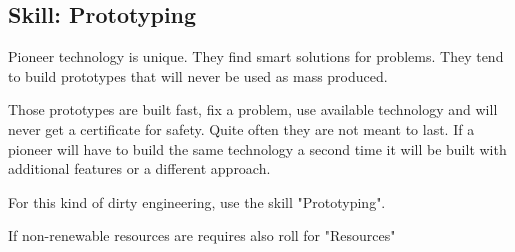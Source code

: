 \subsection{Skill: Prototyping}

Pioneer technology is unique. They find smart solutions for problems. They tend to build prototypes that will never be used as mass produced.

Those prototypes are built fast, fix a problem, use available technology and will never get a certificate for safety.
Quite often they are not meant to last.
If a pioneer will have to build the same technology a second time it will be built with additional features or a different approach.

For this kind of dirty engineering, use the skill "Prototyping".

If non-renewable resources are requires also roll for "Resources"
